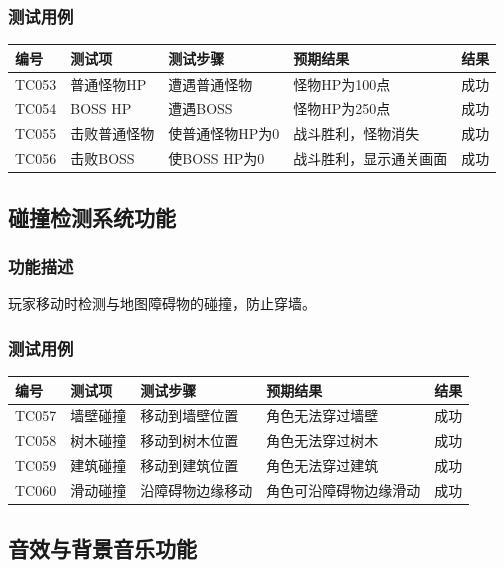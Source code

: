 \documentclass[a4paper,12pt]{article}
\begin{document}
\subsubsection{测试用例}
\begin{longtable}{p{1.2cm} p{2.8cm} p{4cm} p{3.5cm} p{1.5cm}}
\toprule
\textbf{编号} & \textbf{测试项} & \textbf{测试步骤} & \textbf{预期结果} & \textbf{结果} \\
\midrule
\endhead
TC053 & 普通怪物HP & 遭遇普通怪物 & 怪物HP为100点 & 成功 \\
TC054 & BOSS HP & 遭遇BOSS & 怪物HP为250点 & 成功 \\
TC055 & 击败普通怪物 & 使普通怪物HP为0 & 战斗胜利，怪物消失 & 成功 \\
TC056 & 击败BOSS & 使BOSS HP为0 & 战斗胜利，显示通关画面 & 成功 \\
\bottomrule
\end{longtable}

\subsection{碰撞检测系统功能}

\subsubsection{功能描述}
玩家移动时检测与地图障碍物的碰撞，防止穿墙。

\subsubsection{测试用例}
\begin{longtable}{p{1.2cm} p{2.8cm} p{4cm} p{3.5cm} p{1.5cm}}
\toprule
\textbf{编号} & \textbf{测试项} & \textbf{测试步骤} & \textbf{预期结果} & \textbf{结果} \\
\midrule
\endhead
TC057 & 墙壁碰撞 & 移动到墙壁位置 & 角色无法穿过墙壁 & 成功 \\
TC058 & 树木碰撞 & 移动到树木位置 & 角色无法穿过树木 & 成功 \\
TC059 & 建筑碰撞 & 移动到建筑位置 & 角色无法穿过建筑 & 成功 \\
TC060 & 滑动碰撞 & 沿障碍物边缘移动 & 角色可沿障碍物边缘滑动 & 成功 \\
\bottomrule
\end{longtable}

\subsection{音效与背景音乐功能}
\end{document}
